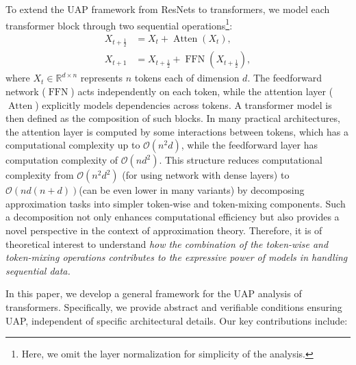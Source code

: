 \documentclass{article}
\newcommand{\ql}[1]{{\footnotesize\textcolor{red}{QL: #1}}}
\begin{document}
To extend the UAP framework from ResNets to transformers,  we model each transformer block through two sequential operations\footnote{Here, we omit the layer normalization  for simplicity of the analysis.}:
\begin{equation}
    \begin{aligned}
    \label{eq:block}
    X_{t+\frac{1}{2}} &= X_t + \operatorname{Atten}(X_t),\\
    X_{t+1} &= X_{t+\frac{1}{2}} + \operatorname{FFN}(X_{t+\frac{1}{2}}),
    \end{aligned}
\end{equation}
where $X_t \in \mathbb{R}^{d\times n}$ represents $n$ tokens each of dimension $d$. The feedforward network ($\operatorname{FFN}$) acts independently on each token, while the attention layer ($\operatorname{Atten}$) explicitly models dependencies across tokens. 
A transformer model is then defined as the composition of such blocks. In many practical architectures, the attention layer is computed by some interactions between tokens, which has a computational complexity up to $\mathcal{O}(n^2d)$, while the feedforward layer has computation complexity of $\mathcal{O}(nd^2)$. This structure reduces computational complexity from $\mathcal{O}(n^2 d^2)$ (for using network with dense layers) to $\mathcal{O}(nd(n+d))$(can be even lower in many variants) by decomposing approximation tasks into simpler token-wise and token-mixing components. Such a decomposition not only enhances computational efficiency but also provides a novel perspective in the context of approximation theory. Therefore, it is of theoretical interest to understand \emph{how the combination of the token-wise and token-mixing operations contributes to the expressive power of models in handling sequential data.}

In this paper, we develop a general framework for the UAP analysis of transformers. Specifically, we provide abstract and verifiable conditions ensuring UAP, independent of specific architectural details. Our key contributions include:
\end{document}
